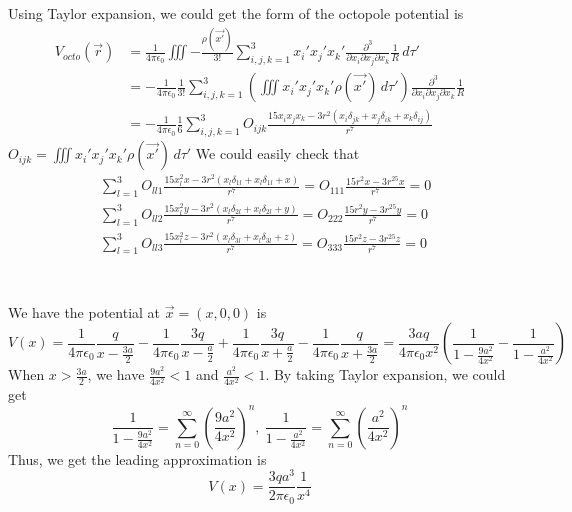 \documentclass[10.5pt]{article}
\begin{document}
\section{}
Using Taylor expansion, we could get the form of the octopole potential is $$\begin{aligned}V_{octo}(\vec{r}) 
    &= \frac{1}{4\pi\epsilon_0} \iiint -\frac{\rho(\vec{x'})}{3!} \sum_{i,j,k=1}^3 x_i'x_j'x_k'\frac{\partial^3}{\partial x_i\partial x_j\partial x_k}\frac{1}{R} \,d\tau'\\
    &=-\frac{1}{4\pi\epsilon_0} \frac{1}{3!} \sum_{i,j,k=1}^3 \left(\iiint x_i'x_j'x_k'\rho(\vec{x'})\,d\tau'\right)\frac{\partial^3}{\partial x_i\partial x_j\partial x_k}\frac{1}{R}\\
    &=-\frac{1}{4\pi\epsilon_0} \frac{1}{6} \sum_{i,j,k=1}^3 O_{ijk} \frac{15x_ix_jx_k-3r^2(x_i\delta_{jk} + x_j\delta_{ik} + x_k\delta_{ij})}{r^7}
\end{aligned}$$\indent
$O_{ijk} = \iiint x_i'x_j'x_k'\rho(\vec{x'})\,d\tau'$\indent
We could easily check that $$\begin{aligned}
    &\sum_{l=1}^3 O_{ll1} \frac{15x_l^2x-3r^2(x_l\delta_{1l} + x_l\delta_{1l} + x)}{r^7} = O_{111}\frac{15r^2x-3r^25x}{r^7} = 0\\
    &\sum_{l=1}^3 O_{ll2} \frac{15x_l^2y-3r^2(x_l\delta_{2l} + x_l\delta_{2l} + y)}{r^7} = O_{222}\frac{15r^2y-3r^25y}{r^7} = 0\\
    &\sum_{l=1}^3 O_{ll3} \frac{15x_l^2z-3r^2(x_l\delta_{3l} + x_l\delta_{3l} + z)}{r^7} = O_{333}\frac{15r^2z-3r^25z}{r^7} = 0\\
\end{aligned}$$

\section{}
\subsection{}
We have the potential at $\vec{x} = (x,0,0)$ is $$V(x) = \frac{1}{4\pi\epsilon_0}\frac{q}{x-\frac{3a}{2}} - \frac{1}{4\pi\epsilon_0}\frac{3q}{x-\frac{a}{2}} + \frac{1}{4\pi\epsilon_0}\frac{3q}{x+\frac{a}{2}} - \frac{1}{4\pi\epsilon_0}\frac{q}{x+\frac{3a}{2}} = \frac{3aq}{4\pi\epsilon_0x^2}\left(\frac{1}{1-\frac{9a^2}{4x^2}} - \frac{1}{1-\frac{a^2}{4x^2}}\right)$$\indent
When $x>\frac{3a}{2}$, we have $\frac{9a^2}{4x^2}<1$ and $\frac{a^2}{4x^2}<1$. By taking Taylor expansion, we could get $$\frac{1}{1-\frac{9a^2}{4x^2}} = \sum_{n=0}^{\infty} \left(\frac{9a^2}{4x^2}\right)^n,~\frac{1}{1-\frac{a^2}{4x^2}} = \sum_{n=0}^{\infty} \left(\frac{a^2}{4x^2}\right)^n$$\indent
Thus, we get the leading approximation is $$V(x) = \frac{3qa^3}{2\pi\epsilon_0} \frac{1}{x^4}$$
\end{document}
